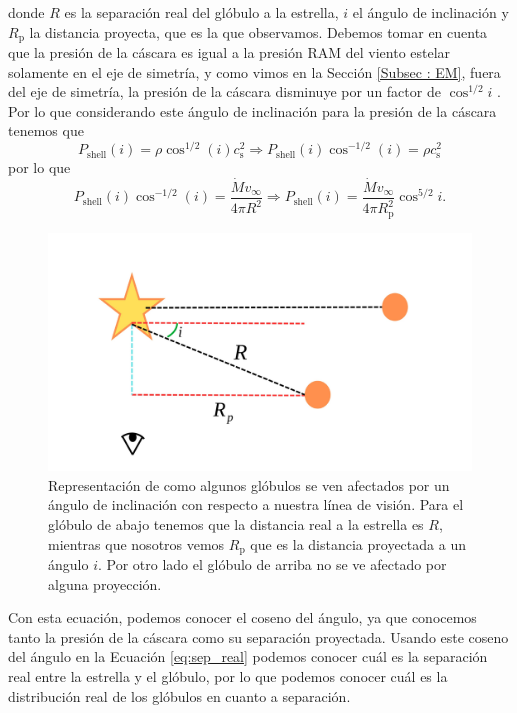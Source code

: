 \documentclass{book}
\begin{document}
\noindent donde $R$ es la separación real del glóbulo a la estrella,
$i$ el ángulo de inclinación y $R_\mathrm{p}$ la distancia proyecta,
que es la que observamos. Debemos tomar en cuenta que la presión de la
cáscara es igual a la presión RAM del viento estelar solamente en el
eje de simetría, y como vimos en la Sección \ref{Subsec : EM}, fuera
del eje de simetría, la presión de la cáscara disminuye por un factor
de $\cos^{1/2}i$ \citep{Tarango:2018}. Por lo que considerando este
ángulo de inclinación para la presión de la cáscara tenemos que
\begin{equation}
    P_\mathrm{shell}(i)=\rho\cos^{1/2}(i) c_\mathrm{s}^2 \Rightarrow P_\mathrm{shell}(i)\cos^{-1/2}(i)=\rho c_\mathrm{s}^2 
\end{equation}
por lo que  
\begin{equation}
P_\mathrm{shell}(i)\cos^{-1/2}(i)=\frac{\dot{M}v_\infty}{4\pi R^2} \Rightarrow
P_\mathrm{shell}(i)=\frac{\dot{M}v_\infty}{4\pi R_\mathrm{p}^2}\cos^{5/2}i.
\end{equation}\label{eq:cos 5_2}

\begin{figure}[htb]
    \centering
    \includegraphics[width=\textwidth]{artesanales/ImgFi01-6.pdf}
    \caption{Representación de como algunos glóbulos se ven afectados
      por un ángulo de inclinación con respecto a nuestra línea de
      visión. Para el glóbulo de abajo tenemos que la distancia real a
      la estrella es $R$, mientras que nosotros vemos $R_\mathrm{p}$
      que es la distancia proyectada a un ángulo $i$. Por otro lado el
      glóbulo de arriba no se ve afectado por alguna proyección.}
    \label{Ang proyeccion}
\end{figure}

Con esta ecuación, podemos conocer el coseno del ángulo, ya que
conocemos tanto la presión de la cáscara como su separación
proyectada. Usando este coseno del ángulo en la Ecuación
\ref{eq:sep_real} podemos conocer cuál es la separación real entre la
estrella y el glóbulo, por lo que podemos conocer cuál es la
distribución real de los glóbulos en cuanto a separación.
\end{document}
